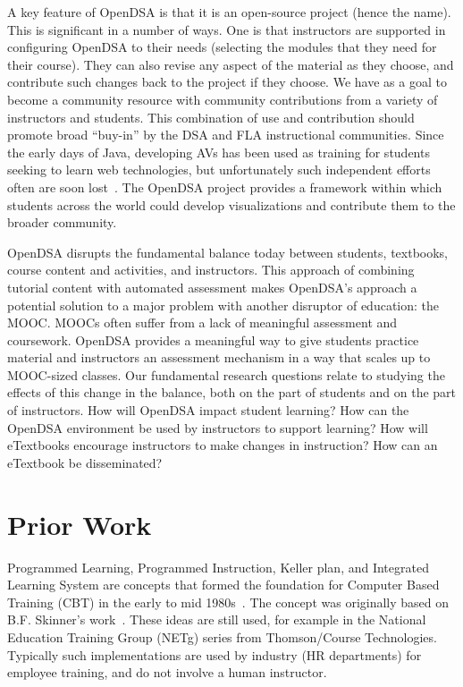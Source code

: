 \documentclass[11pt]{article}
\begin{document}
A key feature of OpenDSA is that it is an open-source project
(hence the name).
This is significant in a number of ways.
One is that instructors are supported in configuring OpenDSA to their
needs (selecting the modules that they need for their course).
They can also revise any aspect of the material as they choose, and
contribute such changes back to the project if they choose.
We have as a goal to become a community resource with community
contributions from a variety of instructors and students.
This combination of use and contribution should promote broad
``buy-in'' by the DSA and FLA instructional communities.
Since the early days of Java, developing AVs has been used as training
for students seeking to learn web technologies, but unfortunately such
independent efforts often are soon lost~\cite{Shaffer10}.
The OpenDSA project provides a framework within which students across
the world could develop visualizations and contribute them to the
broader community.

OpenDSA disrupts the fundamental balance today between students,
textbooks, course content and activities, and instructors.
This approach of combining tutorial content with automated assessment
makes OpenDSA's approach a potential solution to a major problem with
another disruptor of education: the MOOC.
MOOCs often suffer from a lack of meaningful assessment and coursework.
OpenDSA provides a meaningful way to give students practice material
and instructors an assessment mechanism in a way that scales up to
MOOC-sized classes.
Our fundamental research questions relate to studying the effects of
this change in the balance, both on the part of students and on the
part of instructors.
How will OpenDSA impact student learning?
How can the OpenDSA environment be used by instructors to support
learning?
How will eTextbooks encourage instructors to make changes in instruction?
How can an eTextbook be disseminated?

\section{Prior Work}
\label{PriorWork}

Programmed Learning, Programmed Instruction, Keller plan, and Integrated
Learning System are concepts that formed the foundation for Computer
Based Training (CBT) in the early to mid 1980s~\cite{Lockee2004}.
The concept was originally based on B.F. Skinner's work~\cite{Skinner}.
These ideas are still used, for example in the
National Education Training Group (NETg) series from
Thomson/Course Technologies.
Typically such implementations are used by industry (HR departments)
for employee training, and do not involve a human instructor.
\end{document}
